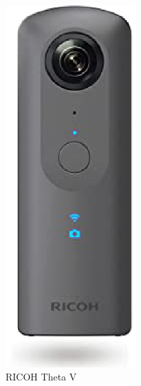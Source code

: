 \documentclass[12pt]{sonota/aislab}
\begin{document}

\begin{figure}[h]
\begin{center}
\includegraphics[clip, width=5cm]{figs/theta_v.eps}
\caption{RICOH Theta V}
\label{ThetaV}
\end{center}
\end{figure}
\end{document}
